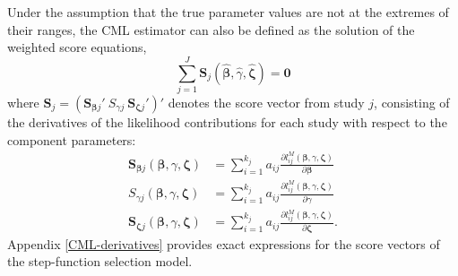 \documentclass[
  man, donotrepeattitle,floatsintext]{apa7}
\begin{document}
Under the assumption that the true parameter values are not at the extremes of their ranges, the CML estimator can also be defined as the solution of the weighted score equations,
\begin{equation}
\sum_{j=1}^J \mathbf{S}_{j}\left(\boldsymbol{\hat\beta}, \hat\gamma, \boldsymbol{\hat\zeta}\right) = \mathbf{0}
\end{equation}
where \(\mathbf{S}_j = \left(\mathbf{S}_{\boldsymbol\beta j}' \  S_{\gamma j} \ \mathbf{S}_{\boldsymbol\zeta j}'\right)'\) denotes the score vector from study \(j\), consisting of the derivatives of the likelihood contributions for each study with respect to the component parameters:
\begin{align}
\mathbf{S}_{\boldsymbol\beta j}\left(\boldsymbol{\beta}, \gamma, \boldsymbol{\zeta}\right) &= \sum_{i=1}^{k_j} a_{ij} \frac{\partial l^M_{ij}\left(\boldsymbol\beta, \gamma, \boldsymbol\zeta\right)}{\partial \boldsymbol\beta} \label{eq:score-M-beta} \\
S_{\gamma j}\left(\boldsymbol{\beta}, \gamma, \boldsymbol{\zeta}\right) &= \sum_{i=1}^{k_j} a_{ij} \frac{\partial l^M_{ij}\left(\boldsymbol\beta, \gamma, \boldsymbol\zeta\right)}{\partial \gamma} \label{eq:score-M-gamma} \\
\mathbf{S}_{\boldsymbol\zeta j}\left(\boldsymbol{\beta}, \gamma, \boldsymbol{\zeta}\right) &= \sum_{i=1}^{k_j} a_{ij} \frac{\partial l^M_{ij}\left(\boldsymbol\beta, \gamma, \boldsymbol\zeta\right)}{\partial \boldsymbol\zeta}. \label{eq:score-M-zeta} 
\end{align}
Appendix \ref{CML-derivatives} provides exact expressions for the score vectors of the step-function selection model.
\end{document}
